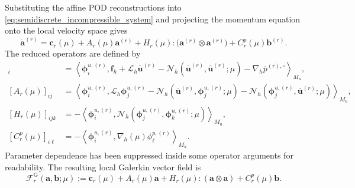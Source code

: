 Substituting the affine POD reconstructions into
\eqref{eq:semidiscrete_incompressible_system} and projecting the momentum
equation onto the local velocity space gives
\begin{equation}
  \dot{\boldsymbol{a}}^{(r)}
  =
  \boldsymbol{c}_r(\mu)
  +A_r(\mu)\boldsymbol{a}^{(r)}
  +H_r(\mu):
   \bigl(\boldsymbol{a}^{(r)}\otimes\boldsymbol{a}^{(r)}\bigr)
  +C_r^p(\mu)\boldsymbol{b}^{(r)}.
  \label{eq:projected_local_momentum_general_mass}
\end{equation}
The reduced operators are defined by
\begin{align}
  [\boldsymbol{c}_r(\mu)]_i
  &=
  \left\langle
    \boldsymbol{\phi}^{u,(r)}_i,
    \boldsymbol{f}_h
    +\mathcal{L}_h\overline{\boldsymbol{u}}^{(r)}
    -\mathcal{N}_h
      (\overline{\boldsymbol{u}}^{(r)},\overline{\boldsymbol{u}}^{(r)};\mu)
    -\nabla_h\overline{p}^{(r),\circ}
  \right\rangle_{M_u},
  \label{eq:galerkin_constant_definition}\\
  [A_r(\mu)]_{ij}
  &=
  \left\langle
    \boldsymbol{\phi}^{u,(r)}_i,
    \mathcal{L}_h\boldsymbol{\phi}^{u,(r)}_j
    -\mathcal{N}_h
      (\overline{\boldsymbol{u}}^{(r)},\boldsymbol{\phi}^{u,(r)}_j;\mu)
    -\mathcal{N}_h
      (\boldsymbol{\phi}^{u,(r)}_j,\overline{\boldsymbol{u}}^{(r)};\mu)
  \right\rangle_{M_u},
  \label{eq:galerkin_linear_definition}\\
  [H_r(\mu)]_{ijk}
  &=
  -\left\langle
    \boldsymbol{\phi}^{u,(r)}_i,
    \mathcal{N}_h
      (\boldsymbol{\phi}^{u,(r)}_j,\boldsymbol{\phi}^{u,(r)}_k;\mu)
  \right\rangle_{M_u},
  \label{eq:galerkin_quadratic_definition}\\
  [C_r^p(\mu)]_{i\ell}
  &=
  -\left\langle
    \boldsymbol{\phi}^{u,(r)}_i,
    \nabla_h(\mu)\phi^{p,(r)}_\ell
  \right\rangle_{M_u}.
  \label{eq:galerkin_pressure_coupling_definition}
\end{align}
Parameter dependence has been suppressed inside some operator arguments for
readability.  The resulting local Galerkin vector field is
\begin{equation}
  \mathscr{F}^{\mathrm{G}}_r
  (\boldsymbol{a},\boldsymbol{b};\mu)
  :=
  \boldsymbol{c}_r(\mu)
  +A_r(\mu)\boldsymbol{a}
  +H_r(\mu):(\boldsymbol{a}\otimes\boldsymbol{a})
  +C_r^p(\mu)\boldsymbol{b}.
  \label{eq:chart_local_galerkin_rhs_definition}
\end{equation}


